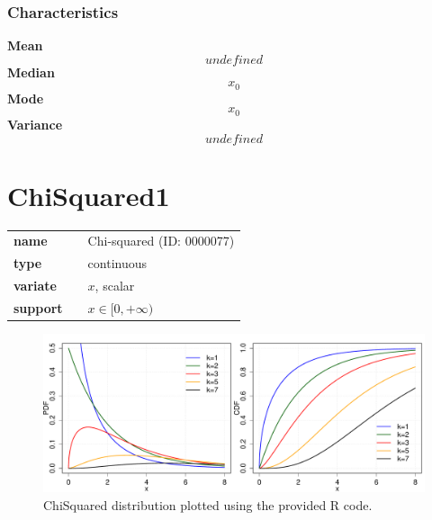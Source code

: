 \subsubsection*{Characteristics}
\smallskip \noindent \hspace{.2cm} \textbf{Mean} 
\begin{equation*}undefined\end{equation*}
\smallskip \noindent \hspace{.2cm} \textbf{Median} 
\begin{equation*}x_0\end{equation*}
\smallskip \noindent \hspace{.2cm} \textbf{Mode} 
\begin{equation*}x_0\end{equation*}
\smallskip \noindent \hspace{.2cm} \textbf{Variance} 
\begin{equation*}undefined\end{equation*}
\smallskip
\section*{ChiSquared1} 

  \bigskip 

\begin{tabular}{p{2cm}cl}
\textbf{name} & & Chi-squared (ID: 0000077)\\ 
 
\textbf{type} & & continuous \\ 

\textbf{variate} & & $x$, scalar \\ 

\textbf{support} & & $x \in [0,+\infty)$
\end{tabular}

\begin{figure}[ht!]
\centering
  \includegraphics[width=140mm]{pics/ChiSquared.pdf}
 \caption{ChiSquared distribution plotted using the provided R code.}
 \label{fig:ChiSquared}
\end{figure}

